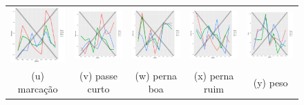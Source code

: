 \documentclass[doc,apacite,oneside,a4paper,12pt]{apa6}
\begin{document}
\begin{figure}
\begin{tabular}{ccccc}
   \includegraphics[width=25mm]{marcacao_result_trans} & \includegraphics[width=25mm]{passecurto_result_trans}   &   \includegraphics[width=25mm]{pernaboa_result_trans}&
  \includegraphics[width=25mm]{pernaruim_result_trans}   & \includegraphics[width=25mm]{peso_result_trans}   \\
 \scriptsize{(u) marcação} & \scriptsize{(v) passe curto } & \scriptsize{(w) perna boa} & \scriptsize{(x) perna ruim} & \scriptsize{(y) peso}\\[3pt]
 

\end{tabular}
\end{figure}
\end{document}
